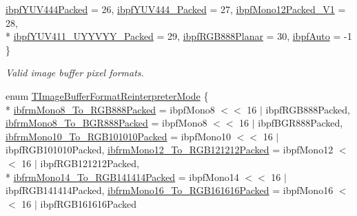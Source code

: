\begin{DoxyCompactItemize}
\hyperlink{group___common_interface_gga456e8aa76e06bb761f27c52141475985a40b9272ee2a2acc8576eb7e1b0e087f7}{ibpf\+Y\+U\+V444\+Packed} = 26, 
\hyperlink{group___common_interface_gga456e8aa76e06bb761f27c52141475985a39bda35000ea73c29480b284acba29ba}{ibpf\+Y\+U\+V444\+\_\+Packed} = 27, 
\hyperlink{group___common_interface_gga456e8aa76e06bb761f27c52141475985a47795e3b914b97fcda4afd6a0e038fca}{ibpf\+Mono12\+Packed\+\_\+\+V1} = 28, 
\\*
\hyperlink{group___common_interface_gga456e8aa76e06bb761f27c52141475985ada117f8b69583b546830c28df3d8aa38}{ibpf\+Y\+U\+V411\+\_\+\+U\+Y\+Y\+V\+Y\+Y\+\_\+\+Packed} = 29, 
\hyperlink{group___common_interface_gga456e8aa76e06bb761f27c52141475985a42ea32a6ebfb2a6c6a2805438848ad5a}{ibpf\+R\+G\+B888\+Planar} = 30, 
\hyperlink{group___common_interface_gga456e8aa76e06bb761f27c52141475985a0a70ec707cba7031e5f732d3935aab17}{ibpf\+Auto} = -\/1
 \}
\begin{DoxyCompactList}\small\item\em Valid image buffer pixel formats. \end{DoxyCompactList}\item 
enum \hyperlink{group___common_interface_ga077e155accbe145213c1c34895f961f2}{T\+Image\+Buffer\+Format\+Reinterpreter\+Mode} \{ \\*
\hyperlink{group___common_interface_gga077e155accbe145213c1c34895f961f2a3290631051651cc3c674d14d83c9cad7}{ibfrm\+Mono8\+\_\+\+To\+\_\+\+R\+G\+B888\+Packed} = ibpf\+Mono8 $<$$<$ 16 $\vert$ ibpf\+R\+G\+B888\+Packed, 
\hyperlink{group___common_interface_gga077e155accbe145213c1c34895f961f2a46fa94564c02bb7590909e0427fb38d8}{ibfrm\+Mono8\+\_\+\+To\+\_\+\+B\+G\+R888\+Packed} = ibpf\+Mono8 $<$$<$ 16 $\vert$ ibpf\+B\+G\+R888\+Packed, 
\hyperlink{group___common_interface_gga077e155accbe145213c1c34895f961f2ae5d88a3ba3957b3be0a5bb400b8ee5e6}{ibfrm\+Mono10\+\_\+\+To\+\_\+\+R\+G\+B101010\+Packed} = ibpf\+Mono10 $<$$<$ 16 $\vert$ ibpf\+R\+G\+B101010\+Packed, 
\hyperlink{group___common_interface_gga077e155accbe145213c1c34895f961f2ae0a32cb34a1dfbe91f884eb591343e6e}{ibfrm\+Mono12\+\_\+\+To\+\_\+\+R\+G\+B121212\+Packed} = ibpf\+Mono12 $<$$<$ 16 $\vert$ ibpf\+R\+G\+B121212\+Packed, 
\\*
\hyperlink{group___common_interface_gga077e155accbe145213c1c34895f961f2a4c6a610c1eb969792a624ef39da1196a}{ibfrm\+Mono14\+\_\+\+To\+\_\+\+R\+G\+B141414\+Packed} = ibpf\+Mono14 $<$$<$ 16 $\vert$ ibpf\+R\+G\+B141414\+Packed, 
\hyperlink{group___common_interface_gga077e155accbe145213c1c34895f961f2a9ab30ea5d9e43103d20e683cc36bd375}{ibfrm\+Mono16\+\_\+\+To\+\_\+\+R\+G\+B161616\+Packed} = ibpf\+Mono16 $<$$<$ 16 $\vert$ ibpf\+R\+G\+B161616\+Packed

\end{DoxyCompactItemize}
